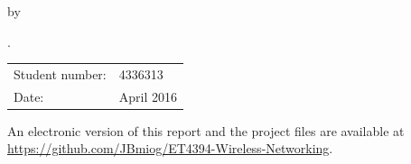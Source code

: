 \begin{titlepage}


\begin{center}


{\makeatletter
\largetitlestyle\fontsize{64}{94}\selectfont\@title
\makeatother}

{\makeatletter
\ifx\@subtitle\undefined\else
    \bigskip
   {\tudsffamily\fontsize{22}{32}\selectfont\@subtitle}    
\fi
\makeatother}

\bigskip
\bigskip

by

\bigskip
\bigskip

{\makeatletter
\largetitlestyle\fontsize{26}{26}\selectfont\@author
\makeatother}

\bigskip
\bigskip

.

\vfill

\begin{tabular}{lll}
    Student number: & 4336313 \\
    Date: & \multicolumn{2}{l}{April 2016} \\
   \end{tabular}

\bigskip
\bigskip
\emph{}

\bigskip
\bigskip
An electronic version of this report and the project files are  available at \url{https://github.com/JBmiog/ET4394-Wireless-Networking}.



\end{center}


\end{titlepage}

